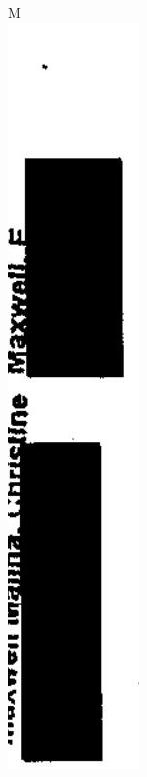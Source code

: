 \documentclass[10pt]{article}
\begin{document}
M\\
\includegraphics[max width=\textwidth, center]{2025_02_27_dd68c3d38de88f0516d9g-158(2)}\\
\end{document}
